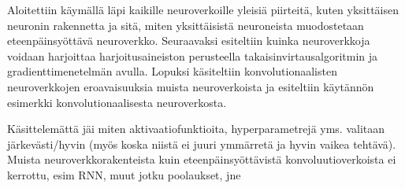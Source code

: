 \documentclass[finnish]{tktltiki2}
\theoremstyle{definition}
\theoremstyle{remark}
\begin{document}
Aloitettiin käymällä läpi kaikille neuroverkoille yleisiä piirteitä, kuten yksittäisen neuronin rakennetta ja sitä, miten yksittäisistä neuroneista muodostetaan eteenpäinsyöttävä neuroverkko. Seuraavaksi esiteltiin kuinka neuroverkkoja voidaan harjoittaa harjoitusaineiston perusteella takaisinvirtausalgoritmin ja gradienttimenetelmän avulla. Lopuksi käsiteltiin konvolutionaalisten neuroverkkojen eroavaisuuksia muista neuroverkoista ja esiteltiin käytännön esimerkki konvolutionaalisesta neuroverkosta.

Käsittelemättä jäi miten aktivaatiofunktioita, hyperparametrejä yms. valitaan järkevästi/hyvin (myös koska niistä ei juuri ymmärretä ja hyvin vaikea tehtävä). Muista neuroverkkorakenteista kuin eteenpäinsyöttävistä konvoluutioverkoista ei kerrottu, esim RNN, muut jotku poolaukset, jne







  
  





  
\end{document}
